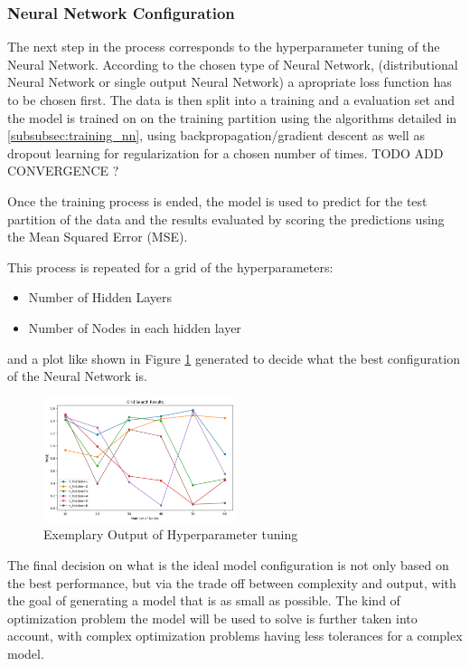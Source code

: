 \subsubsection{Neural Network Configuration}

The next step in the process corresponds to the hyperparameter tuning of the Neural Network. According to the chosen type of Neural Network, (distributional Neural Network or single output Neural Network) a apropriate loss function has to be chosen first. The data is then split into a training and a evaluation set and the model is trained on on the training partition using the algorithms detailed in  \ref{subsubsec:training_nn}, using backpropagation/gradient descent as well as dropout learning for regularization for a chosen number of times.  TODO ADD CONVERGENCE ? 

Once the training process is ended, the model is used to predict for the test partition of the data and the results evaluated by scoring the predictions using the Mean Squared Error (MSE). 

This process is repeated for a grid of the hyperparameters:
\begin{itemize}
	\item Number of Hidden Layers
	\item Number of Nodes in each hidden layer
\end{itemize}

and a plot like shown in Figure	\ref{fig:hyperparm} generated to decide what the best configuration of the Neural Network is. 

\begin{figure}[h] 
	\centering
	\includegraphics[width=0.5\textwidth]{figures/modelling/hyperparm.png} 
	\caption{Exemplary Output of Hyperparameter tuning }
	\label{fig:hyperparm}
\end{figure}

The final decision on what is the ideal model configuration is not only based on the best performance, but via the trade off between complexity and output, with the goal of generating a model that is as small as possible. The kind of optimization problem the model will be used to solve is further taken into account, with complex optimization problems having less tolerances for a complex model.


